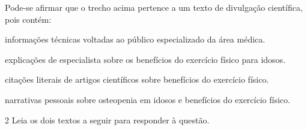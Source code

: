 Pode-se afirmar que o trecho acima pertence a um texto de divulgação científica, pois contém:

\begin{escolha}
  
  \item informações técnicas voltadas ao público especializado da área médica.
  
  \item explicações de especialista sobre os benefícios do exercício físico para idosos.
  
  \item citações literais de artigos científicos sobre benefícios do exercício físico.
  
  \item narrativas pessoais sobre osteopenia em idosos e benefícios do exercício físico.

\end{escolha}

\num{2} Leia os dois textos a seguir para responder à questão. 

